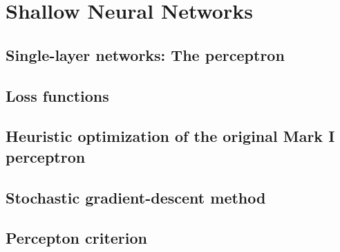 \renewcommand{\prevpart}{1 }
\renewcommand{\thispart}{2 }
\renewcommand{\nextpart}{3 }

\section{Shallow Neural Networks}





% 



\subsection{Single-layer networks: The perceptron}


\subsection{Loss functions}
\subsection{Heuristic optimization of the original Mark I perceptron}
\subsection{Stochastic gradient-descent method}
\subsection{Percepton criterion}
